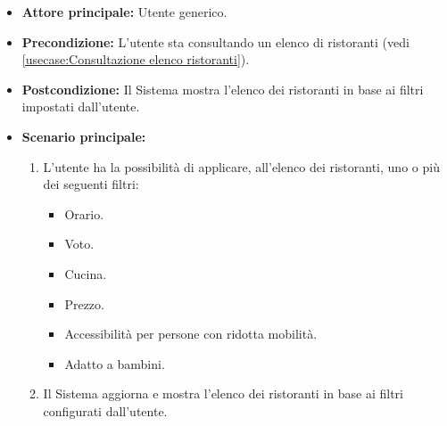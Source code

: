 \label{usecase:Filtra ristoranti}
\begin{itemize}
	\item \textbf{Attore principale:} Utente generico.
	
	\item \textbf{Precondizione:} L'utente sta consultando un elenco di ristoranti (vedi \autoref{usecase:Consultazione elenco ristoranti}).

	\item \textbf{Postcondizione:} Il Sistema mostra l'elenco dei ristoranti in base ai filtri impostati dall'utente.
 
	      
	\item \textbf{Scenario principale:}
	      \begin{enumerate}
		      \item L'utente ha la possibilità di applicare, all'elenco dei ristoranti, uno o più dei seguenti filtri: 
		      \begin{itemize}
                \item Orario.
                \item Voto.
                \item Cucina.
                \item Prezzo.
                \item Accessibilità per persone con ridotta mobilità.
                \item Adatto a bambini.
              \end{itemize}

		      \item Il Sistema aggiorna e mostra l'elenco dei ristoranti in base ai filtri configurati dall'utente.
	      \end{enumerate}

\end{itemize}